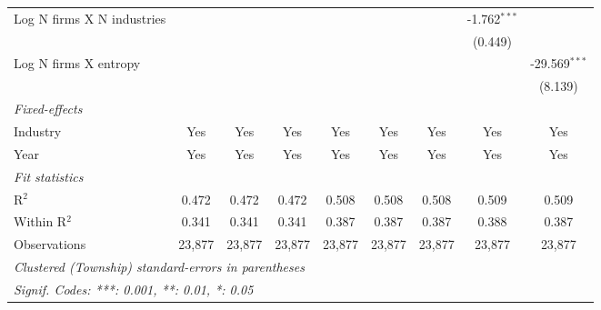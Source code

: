 \begin{tabular}{lcccccccc}
   Log N firms X N industries                            &                 &                 &                 &                  &                  &                  & -1.762$^{***}$   &   \\   
                                                         &                 &                 &                 &                  &                  &                  & (0.449)          &   \\   
   Log N firms X entropy                                 &                 &                 &                 &                  &                  &                  &                  & -29.569$^{***}$\\   
                                                         &                 &                 &                 &                  &                  &                  &                  & (8.139)\\   
   \midrule
   \emph{Fixed-effects}\\
   Industry                                              & Yes             & Yes             & Yes             & Yes              & Yes              & Yes              & Yes              & Yes\\  
   Year                                                  & Yes             & Yes             & Yes             & Yes              & Yes              & Yes              & Yes              & Yes\\  
   \midrule
   \emph{Fit statistics}\\
   R$^2$                                                 & 0.472           & 0.472           & 0.472           & 0.508            & 0.508            & 0.508            & 0.509            & 0.509\\  
   Within R$^2$                                          & 0.341           & 0.341           & 0.341           & 0.387            & 0.387            & 0.387            & 0.388            & 0.387\\  
   Observations                                          & 23,877          & 23,877          & 23,877          & 23,877           & 23,877           & 23,877           & 23,877           & 23,877\\  
   \midrule \midrule
   \multicolumn{9}{l}{\emph{Clustered (Township) standard-errors in parentheses}}\\
   \multicolumn{9}{l}{\emph{Signif. Codes: ***: 0.001, **: 0.01, *: 0.05}}\\
\end{tabular}
\par\endgroup
